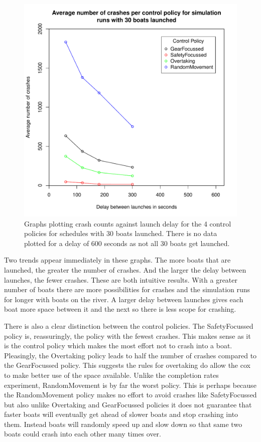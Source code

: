   \begin{figure}
  \begin{center}
    \includegraphics[scale=0.8]{"images/graphs/Average number of crashes per control policy for simulation runs with 30 boats launched"}
    \caption{Graphs plotting crash counts against launch delay for the 4 control policies for schedules with 30 boats launched. There is no data plotted for a delay of 600 seconds as not all 30 boats get launched.}
    \label{experiments:fig:crash_counts_30_launches}
  \end{center}
  \end{figure}
  
  Two trends appear immediately in these graphs. The more boats that are launched, the greater the number of crashes. And the larger the delay between launches, the fewer crashes. These are both intuitive results. With a greater number of boats there are more possibilities for crashes and the simulation runs for longer with boats on the river. A larger delay between launches gives each boat more space between it and the next so there is less scope for crashing.
  
  There is also a clear distinction between the control policies. The SafetyFocussed policy is, reassuringly, the policy with the fewest crashes. This makes sense as it is the control policy which makes the most effort not to crash into a boat. Pleasingly, the Overtaking policy leads to half the number of crashes compared to the GearFocussed policy. This suggests the rules for overtaking do allow the cox to make better use of the space available. Unlike the completion rates experiment, RandomMovement is by far the worst policy. This is perhaps because the RandomMovement policy makes no effort to avoid crashes like SafetyFocussed but also unlike Overtaking and GearFocussed policies it does not guarantee that faster boats will eventually get ahead of slower boats and stop crashing into them. Instead boats will randomly speed up and slow down so that same two boats could crash into each other many times over.

